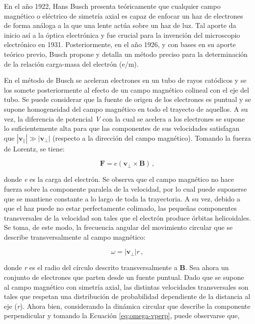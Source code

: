 En el año 1922, Hans Busch presenta teóricamente que cualquier campo magnético o eléctrico de simetría axial es capaz de enfocar un haz de electrones de forma análoga a la que una lente actúa sobre un haz de luz. Tal aporte da inicio así a la óptica electrónica y fue crucial para la invención del microscopio electrónico en 1931. Posteriormente, en el año 1926, y con bases en su aporte teórico previo, Busch propone y detalla un método preciso para la determinación de la relación carga-masa del electrón (e/m). 

En el método de Busch se aceleran electrones en un tubo de rayos catódicos y se los somete posteriormente al efecto de un campo magnético colineal con el eje del tubo. Se puede considerar que la fuente de origen de los electrones es puntual y se supone homogeneidad del campo magnético en todo el trayecto de aquellos. A su vez, la diferencia de potencial \textit{V} con la cual se acelera a los electrones se supone lo suficientemente alta para que las componentes de sus velocidades satisfagan que $
|\mathbf{v_\parallel}| \gg |\mathbf{v_\perp}|$ (respecto a la dirección del campo magnético). Tomando la fuerza de Lorentz, se tiene:

\begin{equation}
    \mathbf{F} = e(\mathbf{v_\perp\times\mathbf{B}})\,,
\end{equation}

\noindent donde \textit{e} es la carga del electrón. Se observa que el campo magnético no hace fuerza sobre la componente paralela de la velocidad, por lo cual puede suponerse que se mantiene constante a lo largo de toda la trayectoria. A su vez, debido a que el haz puede no estar perfectamente colimado, las pequeñas componentes transversales de la velocidad son tales que el electrón produce órbitas helicoidales. Se toma, de este modo, la frecuencia angular del movimiento circular que se describe transversalmente al campo magnético:

\begin{equation}
    \omega = |\mathbf{v_\perp}|r\,,
    \label{eq:omega-vperp}
\end{equation}

\noindent donde \textit{r} es el radio del círculo descrito transversalmente a $\mathbf{B}$. Sea ahora un conjunto de electrones que parten desde un fuente puntual. Dado que se supone al campo magnético con simetría axial, las distintas velocidades transversales son tales que respetan una distribución de probabilidad dependiente de la distancia al eje (\textit{r}). Ahora bien, considerando la dinámica circular que describe la componente perpendicular y tomando la Ecuación \ref{eq:omega-vperp}, puede observarse que,


